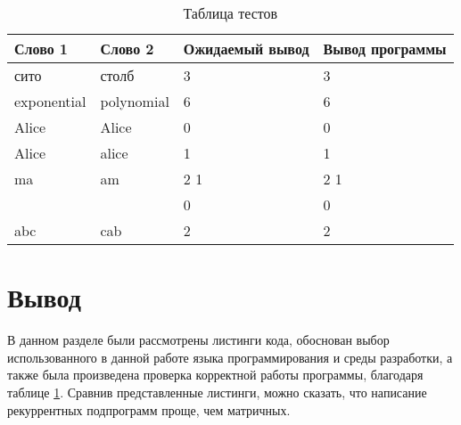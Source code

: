 \begin{table}[ht]
	\centering
	\caption{Таблица тестов}
	\label{table:ref1}
	\begin{tabular}{ | l | l | l | l |}
		\hline
		Слово 1 & Слово 2 & Ожидаемый вывод &  Вывод программы  \\ \hline
		сито & столб & 3 & 3 \\ \hline
		exponential & polynomial & 6 & 6 \\ \hline
		Alice & Alice & 0 & 0 \\ \hline
		Alice & alice & 1 & 1 \\ \hline
		ma  & am & 2 1 &  2 1 \\ \hline
		& & 0 & 0 \\ \hline
		abc & cab & 2 & 2 \\ \hline
		\hline
	\end{tabular}
\end{table} 



\section{Вывод}

В данном разделе были рассмотрены листинги кода, обоснован выбор использованного в данной работе языка программирования и среды разработки, а также была произведена проверка корректной работы программы, благодаря таблице \ref{table:ref1}.
Сравнив представленные листинги, можно сказать, что написание рекуррентных подпрограмм проще, чем матричных.
